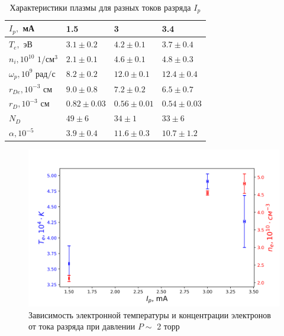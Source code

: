 \documentclass[a4paper,12pt]{article} %
\begin{document}
\begin{table}[h!]
\caption{Характеристики плазмы для разных токов разряда $I_p$}
\label{data}
\begin{tabular}{|l|l|l|l|}
\hline
$I_p,$ мА                & 1.5               & 3                 & 3.4               \\ \hline
$T_e,$ эВ                & $ 3.1 \pm 0.2 $   & $ 4.2 \pm 0.1 $   & $ 3.7 \pm 0.4 $   \\ \hline
$n_i, 10^{10}$ $ 1/см^3$    & $ 2.1 \pm 0.1 $   & $ 4.6 \pm 0.1 $   & $ 4.8 \pm 0.3 $   \\ \hline
$\omega_p, 10^{9}$ $ рад/с$ & $ 8.2 \pm 0.2 $   & $ 12.0 \pm 0.1 $  & $ 12.4 \pm 0.4 $  \\ \hline
$r_{De}, 10^{-3} $ $см$     & $ 9.0 \pm 0.8 $   & $ 7.2 \pm 0.2 $   & $ 6.5 \pm 0.7 $   \\ \hline
$r_{D}, 10^{-3} $ $см$      & $ 0.82 \pm 0.03 $ & $ 0.56 \pm 0.01 $ & $ 0.54 \pm 0.03 $ \\ \hline
$N_{D}$                  & $ 49 \pm 6 $      & $ 34 \pm 1 $      & $ 33 \pm 6 $      \\ \hline
$\alpha, 10^{-5}$        & $ 3.9 \pm 0.4 $   & $ 11.6 \pm 0.3 $  & $ 10.7 \pm 1.2 $  \\ \hline
\end{tabular}
\end{table}

\begin{figure}[h!]
\begin{center}
\includegraphics[width=\textwidth]{T,n(I_p)}
\caption{Зависимость электронной температуры и концентрации электронов от тока разряда при давлении $P \sim$ 2 торр} \label{от_тока_разряда}
\end{center}
\end{figure}
\end{document}

